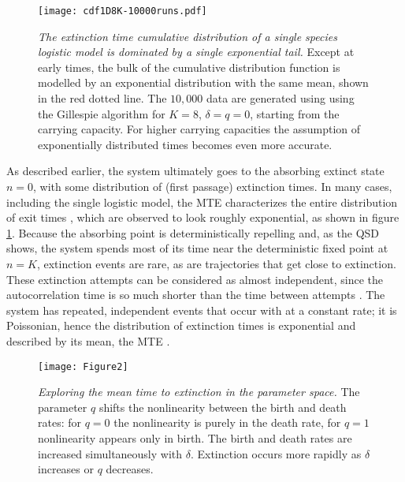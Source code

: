 \begin{figure}[h]
	\centering
	\texttt{[image: cdf1D8K-10000runs.pdf]}
	\caption{\emph{The extinction time cumulative distribution of a single species logistic model is dominated by a single exponential tail.} 
	Except at early times, the bulk of the cumulative distribution function is modelled by an exponential distribution with the same mean, shown in the red dotted line. 
	The $10,000$ data are generated using using the Gillespie algorithm for $K=8$, $\delta=q=0$, starting from the carrying capacity. For higher carrying capacities the assumption of exponentially distributed times becomes even more accurate. 
	} \label{etimedistr}
\end{figure}

As described earlier, the system ultimately goes to the absorbing extinct state $n=0$, with some distribution of (first passage) extinction times. %
In many cases, including the single logistic model, the MTE characterizes the entire distribution of exit times \cite{Hanggi1990,Bel2010}, which are observed to look roughly exponential, as shown in figure \ref{etimedistr}.  
Because the absorbing point is deterministically repelling and, as the QSD shows, the system spends most of its time near the deterministic fixed point at $n=K$, extinction events are rare, as are trajectories that get close to extinction. 
These extinction attempts can be considered as almost independent, since the autocorrelation time is so much shorter than the time between attempts \cite{Hanggi1990,Lande1993}. %
The system has repeated, independent events that occur with at a constant rate; it is Poissonian, hence the distribution of extinction times is exponential and described by its mean, the MTE \cite{Hanggi1990,Leigh1981,Lande1993,Foley1994}. 

\begin{figure}[h]
	\centering
	\texttt{[image: Figure2]}
	\caption{\emph{Exploring the mean time to extinction in the parameter space.} The parameter $q$ shifts the nonlinearity between the birth and death rates: for $q=0$ the nonlinearity is purely in the death rate, for $q=1$ nonlinearity appears only in birth. The birth and death rates are increased simultaneously with $\delta$. Extinction occurs more rapidly as $\delta$ increases or $q$ decreases. } \label{mteCP}
\end{figure}

